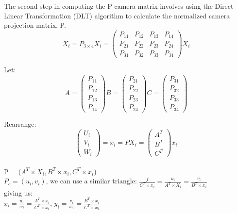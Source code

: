 \documentclass[12pt]{article}
\begin{document}
\noindent The second step in computing the P camera matrix involves using the Direct Linear Transformation (DLT) algorithm to calculate the normalized camera projection matrix.
P.
\[ 
X_{i} = P_{3 \times 4} X_{i} = 
\begin{pmatrix}
P_{11} & P_{12} & P_{13} & P_{14} \\
P_{21} & P_{22} & P_{23} & P_{24} \\
P_{31} & P_{32} & P_{33} & P_{34}
\end{pmatrix} X_{i}
\]

\noindent Let:
\[ 
A = 
\begin{pmatrix}
P_{11} \\ P_{12} \\ P_{13} \\ P_{14}
\end{pmatrix}
B = 
\begin{pmatrix}
P_{21} \\ P_{22} \\ P_{23} \\ P_{24}
\end{pmatrix}
C = 
\begin{pmatrix}
P_{31} \\ P_{32} \\ P_{33} \\ P_{34}
\end{pmatrix}
\]

\noindent Rearrange:
\[
\begin{pmatrix}
U_{i} \\ V_{i} \\ W_{i}
\end{pmatrix} = x_{i}=PX_{i} = 
\begin{pmatrix}
A^{T} \\ B^{T} \\ C^{T}
\end{pmatrix} x_{i}
\]\\

\noindent 
P = ($A^{T} \times X_{i}, B^{T} \times x_{i}, C^{T} \times x_{i}$) \\

\noindent
$P_{c} = (u_{i}, v_{i})$, we can use a similar triangle:
$\frac{f}{C^{T} \times x_{i}} = \frac{u_{i}}{A^{T} \times X_{i}} = \frac{v_{i}}{B^{T} \times x_{i}}$ \\

\noindent giving us: \\
$x_{i} = \frac{u_{i}}{w_{i}} = \frac{A^{T} \times x_{i}}{C^{T} \times x_{i}}$,
$y_{i} = \frac{v_{i}}{w_{i}} = \frac{B^{T} \times x_{i}}{C^{T} \times x_{i}}$\\
\end{document}
